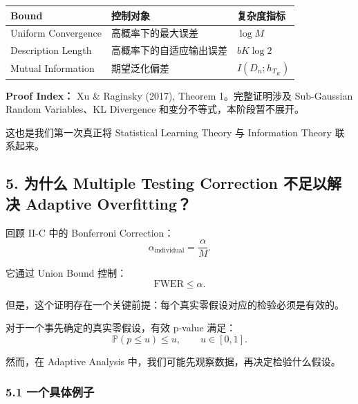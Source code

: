 \begin{readertable}
\begin{longtable}[]{@{}
  >{\raggedright\arraybackslash}p{}
  >{\raggedright\arraybackslash}p{}
  >{\raggedright\arraybackslash}p{}@{}}
\toprule
Bound & 控制对象 & 复杂度指标 \\
\midrule
\endhead
Uniform Convergence & 高概率下的最大误差 & \(\log M\) \\
Description Length & 高概率下的自适应输出误差 & \(bK\log 2\) \\
Mutual Information & 期望泛化偏差 & \(I(D_n;h_{T_K})\) \\
\bottomrule
\end{longtable}
\end{readertable}

\textbf{Proof Index：} Xu \& Raginsky (2017), Theorem 1。完整证明涉及 Sub-Gaussian Random Variables、KL Divergence 和变分不等式，本阶段暂不展开。

这也是我们第一次真正将 Statistical Learning Theory 与 Information Theory 联系起来。

\hypertarget{part-2-20-0001-ux4e3aux4ec0ux4e48-multiple-testing-correction-ux4e0dux8db3ux4ee5ux89e3ux51b3-adaptive-overfitting}{%
\subsection{5. 为什么 Multiple Testing Correction 不足以解决 Adaptive Overfitting？}\label{part-2-20-0001-ux4e3aux4ec0ux4e48-multiple-testing-correction-ux4e0dux8db3ux4ee5ux89e3ux51b3-adaptive-overfitting}}

回顾 II-C 中的 Bonferroni Correction：
\[\alpha_{\mathrm{individual}}=\frac{\alpha}{M}.\]

它通过 Union Bound 控制：
\[\mathrm{FWER}\leq\alpha.\]

但是，这个证明存在一个关键前提：每个真实零假设对应的检验必须是有效的。

对于一个事先确定的真实零假设，有效 p-value 满足：
\[\mathbb P(p\leq u)\leq u,
\qquad u\in[0,1].\]

然而，在 Adaptive Analysis 中，我们可能先观察数据，再决定检验什么假设。

\hypertarget{part-2-20-0001-ux4e00ux4e2aux5177ux4f53ux4f8bux5b50}{%
\subsubsection{5.1 一个具体例子}\label{part-2-20-0001-ux4e00ux4e2aux5177ux4f53ux4f8bux5b50}}


